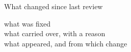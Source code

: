 \begin{frame}{What changed since last review}
  \begin{console}
    what was fixed\\
     what carried over, with a reason\\
      what appeared, and from which change
  \end{console}
\end{frame}
